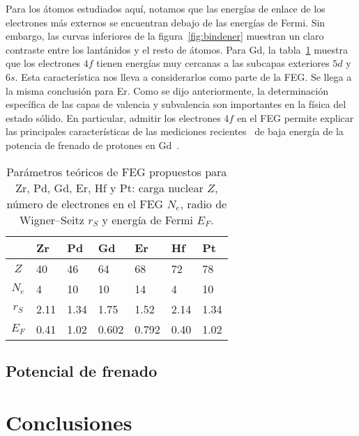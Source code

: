Para los átomos estudiados aquí, notamos que las energías de enlace de 
los electrones más externos se encuentran debajo de las energías de 
Fermi. Sin embargo, las curvas inferiores de la figura~\ref{fig:bindener} 
muestran un claro contraste entre los lantánidos y el resto de átomos. 
Para Gd, la tabla~\ref{tab:electronFEG} muestra que los electrones $4f$ 
tienen energías muy cercanas a las subcapas exteriores $5d$ y $6s$. Esta 
característica nos lleva a considerarlos como parte de la FEG. Se llega 
a la misma conclusión para Er. Como se dijo anteriormente, la 
determinación específica de las capas de valencia y subvalencia son 
importantes en la física del estado sólido. En particular, admitir los 
electrones $4f$ en el FEG permite explicar las principales características 
de las mediciones recientes~\cite{Montanari:17,Montanari:19} de baja 
energía de la potencia de frenado de protones en Gd~\cite{Roth:17}.

\begin{table}[!ht]
\centering
\begin{tabular}{|c|l|l|l|l|l|l|}
\hline
& \mbox{Zr} & \mbox{Pd} & \mbox{Gd} & \mbox{Er} & \mbox{Hf} & \mbox{Pt} \\
\hline
\hline
 $Z$       & 40   & 46   & 64   &  68   &  72   &  78   \\
\hline
 $N_e$     & 4    & 10   & 10   &  14   &  4    &  10   \\
\hline
 $r_S$     & 2.11 & 1.34 & 1.75 & 1.52  &  2.14 & 1.34  \\
\hline
 $E_F$     & 0.41 & 1.02 & 0.602& 0.792 &  0.40 & 1.02  \\
\hline
\end{tabular}
\caption[Parámetros teóricos de FEG para blancos relativistas.]
{Parámetros teóricos de FEG propuestos para Zr, Pd,  Gd, Er, Hf y Pt: 
carga nuclear $Z$, número de electrones en el FEG $N_e$, radio de 
Wigner--Seitz $r_S$ y energía de Fermi $E_F$.}
\label{tab:electronFEG} 
\end{table}

\subsection{Potencial de frenado}
\label{subsec:results-stopping}


\section{Conclusiones}
\label{sec:conclu-heavy}

